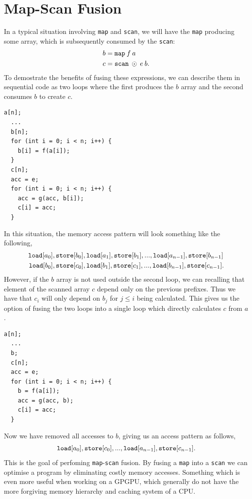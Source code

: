 \documentclass[11pt]{article}
\begin{document}
\section{Map-Scan Fusion}
In a typical situation involving \texttt{map} and \texttt{scan}, we will have the \texttt{map} producing some array, which is subsequently
 consumed by the \texttt{scan}:
\begin{align*}
  b &= \mathtt{map} \: f \: a \\
  c &= \mathtt{scan} \: \odot \: e \: b\mathnormal{.}
\end{align*}
To demostrate the benefits of fusing these expressions, we can describe them in sequential code as two loops where the first produces the $b$ array and the second consumes $b$ to create $c$.
\begin{lstlisting}[caption=\texttt{map} and \texttt{scan} as sequential loops.]
  a[n];
  ...
  b[n];
  for (int i = 0; i < n; i++) {
    b[i] = f(a[i]);
  }
  c[n];
  acc = e;
  for (int i = 0; i < n; i++) {
    acc = g(acc, b[i]);
    c[i] = acc;
  }
\end{lstlisting}
In this situation, the memory access pattern will look something like the following,
\begin{align*}
  \mathtt{load}[a_0]&, \mathtt{store}[b_0], \mathtt{load}[a_1], \mathtt{store}[b_1], ..., \mathtt{load}[a_{n-1}], \mathtt{store}[b_{n-1}] \\
  \mathtt{load}[b_0]&, \mathtt{store}[c_0], \mathtt{load}[b_1], \mathtt{store}[c_1], ..., \mathtt{load}[b_{n-1}], \mathtt{store}[c_{n-1}]\mathnormal{.}
\end{align*}
However, if the $b$ array is not used outside the second loop, we can recalling that element of the scanned array $c$ depend only on the previous prefixes. 
Thus we have that $c_i$ will only depend on $b_j$ for $j \leq i$ being calculated. This gives us the option of fusing the two loops into a single loop which directly calculates $c$ from $a$.
\begin{lstlisting}[caption=\texttt{map} and \texttt{scan} loops fused.]
  a[n];
  ...
  b;
  c[n];
  acc = e;
  for (int i = 0; i < n; i++) {
    b = f(a[i]);
    acc = g(acc, b);
    c[i] = acc;
  }
\end{lstlisting}
Now we have removed all accesses to $b$, giving us an access pattern as follows,
 $$\mathtt{load}[a_0],  \mathtt{store}[c_0], ..., \mathtt{load}[a_{n-1}],  \mathtt{store}[c_{n-1}]\mathnormal{.}$$
This is the goal of perfoming \texttt{map}-\texttt{scan} fusion. By fusing a \texttt{map} into a \texttt{scan} we can optimise a program by eliminating costly memory accesses.
 Something which is even more useful when working on a GPGPU, which generally do not have the more forgiving memory hierarchy and caching system of a CPU.
\end{document}
